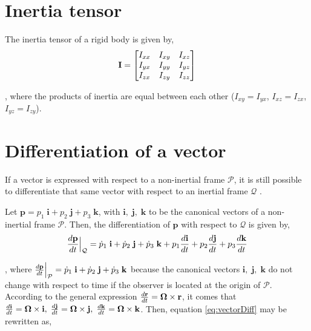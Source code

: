 \section{Inertia tensor}
\label{section:inertiaTensor}

The inertia tensor of a rigid body is given by,
\begin{equation}
	\mathbf{I} = \begin{bmatrix}
		I_{xx} & I_{xy} & I_{xz}\\
		I_{yx} & I_{yy} & I_{yz}\\
		I_{zx} & I_{zy} & I_{zz}
	\end{bmatrix}
	\label{eq:annexInertiaTensor}
\end{equation}

\noindent, where the products of inertia are equal between each other ($I_{xy} = I_{yx}$, $I_{xz} = I_{zx}$, $I_{yz} = I_{zy}$).

\section{Differentiation of a vector}
\label{section:vectorDiff}

If a vector is expressed with respect to a non-inertial frame $\mathcal{P}$, it is still possible to differentiate that same vector with respect to an inertial frame $\mathcal{Q}$ \cite{Beer2015}.

Let $\mathbf{p} = p_1 \; \mathbf{i} + p_2 \; \mathbf{j} + p_3 \; \mathbf{k}$, with $\mathbf{i}, \; \mathbf{j}, \; \mathbf{k}$ to be the canonical vectors of a non-inertial frame $\mathcal{P}$. Then, the differentiation of $\mathbf{p}$ with respect to $\mathcal{Q}$ is given by,
\begin{equation}
	\frac{d \mathbf{p}}{dt}\Bigr|_{\mathcal{Q}} = \dot{p}_1 \; \mathbf{i} + \dot{p}_2 \; \mathbf{j} + \dot{p}_3 \; \mathbf{k} + p_1 \frac{d \mathbf{i}}{dt} + p_2 \frac{d \mathbf{j}}{dt} + p_3 \frac{d \mathbf{k}}{dt}
	\label{eq:vectorDiff}
\end{equation}
 
\noindent, where $\frac{d \mathbf{p}}{dt}\Bigr|_{\mathcal{P}} = \dot{p}_1 \; \mathbf{i} + \dot{p}_2 \; \mathbf{j} + \dot{p}_3 \; \mathbf{k}$ because the canonical vectors $\mathbf{i}, \; \mathbf{j}, \; \mathbf{k}$ do not change with respect to time if the observer is located at the origin of $\mathcal{P}$. According to the general expression $\derivative{\mathbf{r}} = \bm{\Omega} \times \mathbf{r}$, it comes that $\derivative{\mathbf{i}} = \bm{\Omega} \times \mathbf{i}, \; \derivative{\mathbf{j}} = \bm{\Omega} \times \mathbf{j}, \; \derivative{\mathbf{k}} = \bm{\Omega} \times \mathbf{k}$. Then, equation \ref{eq:vectorDiff} may be rewritten as,

